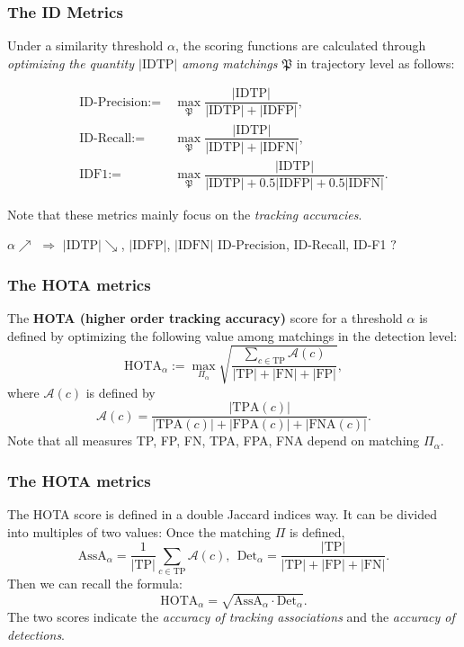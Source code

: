 \documentclass[slidetop, mathserif]{beamer}
\begin{document}
\begin{frame}
	\frametitle{The ID Metrics}
			
	Under a similarity threshold $\alpha$, the scoring functions are calculated
	through
	\emph{optimizing the quantity $|\text{IDTP}|$ among matchings $\mathfrak P$}
	in trajectory level as follows:

	\vspace{-15pt}
	\begin{align*}
		\text{ID-Precision} := & ~ \max_{\mathfrak P} \dfrac{|\text{IDTP}|}{|\text{IDTP}| + |\text{IDFP}|}, \\
		\text{ID-Recall} :=    & ~ \max_{\mathfrak P}\dfrac{|\text{IDTP}|}{|\text{IDTP}| + |\text{IDFN}|},  \\
		\text{IDF1} :=         &                                                                            
		~ \max_{\mathfrak P}\dfrac{|\text{IDTP}|}{|\text{IDTP}| + 0.5|\text{IDFP}| + 0.5|\text{IDFN}|}.
	\end{align*}

	Note that these metrics mainly focus on the {\color{olive}\emph{tracking accuracies}}.

	\vspace{5pt}

	$\alpha\nearrow$ $\Rightarrow$ $|\text{IDTP}|\searrow$,
	$|\text{IDFP}|$, $|\text{IDFN}|$ ID-Precision, ID-Recall, ID-F1 $?$

\end{frame}

\begin{frame}
	\frametitle{The HOTA metrics}
		
	The {\bf HOTA (higher order tracking accuracy)} score for a threshold $\alpha$ is defined by
	optimizing the following value among matchings in the detection level:
	\[
		\text{HOTA}_\alpha := 
		\max_{\Pi_\alpha} \sqrt{\dfrac{\sum_{c\in\text{TP}} \mathcal A(c) }{|\text{TP}|+|\text{FN}|+|\text{FP}|}},
	\]
	where $\mathcal A(c)$ is defined by
	\[
		\mathcal A(c) = \dfrac{|\text{TPA}(c)|}{|\text{TPA}(c)|+|\text{FPA}(c)|+|\text{FNA}(c)|}.
	\]
	Note that all measures TP, FP, FN, TPA, FPA, FNA depend on matching $\Pi_\alpha$.
		
\end{frame}

\begin{frame}
	\frametitle{The HOTA metrics}
	The HOTA score is defined in a double Jaccard indices way.
	It can be divided into multiples of two values:
	Once the matching $\Pi$ is defined,
	\[
		\text{AssA}_\alpha = \dfrac{1}{|\text{TP}|} \sum_{c\in\text{TP}} \mathcal A(c), \ \ 
		\text{Det}_\alpha = \dfrac{|\text{TP}|}{|\text{TP}| + |\text{FP}| + |\text{FN}|}.
	\]
	Then we can recall the formula:
	\[
		\text{HOTA}_\alpha = \sqrt{\text{AssA}_\alpha \cdot \text{Det}_\alpha}.
	\]
	The two scores indicate the {\color{olive}\emph{accuracy of tracking associations}}
	and the {\color{blue}\emph{accuracy of detections}}.
\end{frame}
\end{document}
